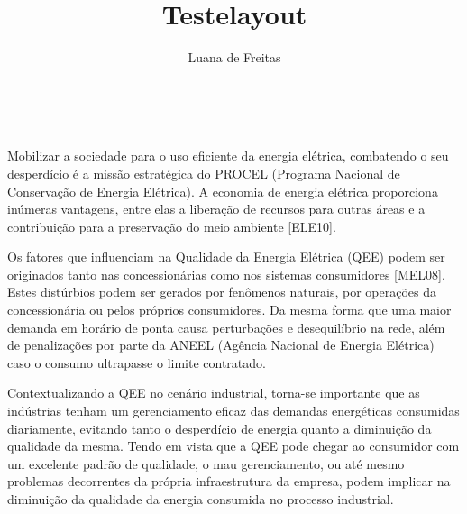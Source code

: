 \documentclass[12pt,a4paper,oneside]{article}
\author{Luana de Freitas}
\title{Testelayout}
\begin{document}
\pagestyle{fancy}
\\
\par 
Mobilizar a sociedade para o uso eficiente da energia elétrica, combatendo o seu desperdício é a missão estratégica do PROCEL (Programa Nacional de Conservação de Energia Elétrica). A economia de energia elétrica proporciona inúmeras vantagens, entre elas a liberação de recursos para outras áreas e a contribuição para a preservação do meio ambiente [ELE10].
\par
Os fatores que influenciam na Qualidade da Energia Elétrica (QEE) podem ser originados tanto nas concessionárias como nos sistemas consumidores [MEL08]. Estes distúrbios podem ser gerados por fenômenos naturais, por operações da concessionária ou pelos próprios consumidores. 
Da mesma forma que uma maior demanda em horário de ponta causa perturbações e desequilíbrio na rede, além de penalizações por parte da ANEEL (Agência Nacional de Energia Elétrica) caso o consumo ultrapasse o limite contratado.
\par
Contextualizando a QEE no cenário industrial, torna-se importante que as indústrias tenham um gerenciamento eficaz das demandas energéticas consumidas diariamente, evitando tanto o desperdício de energia quanto a diminuição da qualidade da mesma. 
Tendo em vista que a QEE pode chegar ao consumidor com um excelente padrão de qualidade, o mau gerenciamento, ou até mesmo problemas  decorrentes da própria infraestrutura da empresa, podem implicar na diminuição da qualidade da energia consumida no processo industrial.
\end{document}
